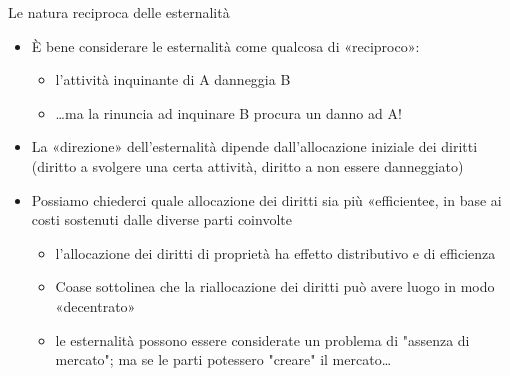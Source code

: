\documentclass[aspectratio=64,11pt]{beamer}
\begin{document}
\begin{frame}{Le natura reciproca delle esternalità}
\begin{itemize}
\item È bene considerare le esternalità come qualcosa di «reciproco»:
\begin{itemize}
\item l'attività inquinante di A danneggia B
\item \ldots{}ma la rinuncia ad inquinare B procura un danno ad A!
\end{itemize}
\item La «direzione» dell'esternalità dipende dall'allocazione iniziale dei
diritti (diritto a svolgere una certa attività, diritto a non essere
danneggiato)
\item Possiamo chiederci quale allocazione dei diritti sia più «efficiente¢, in
base ai costi sostenuti dalle diverse parti coinvolte
\begin{itemize}
\item l'allocazione dei diritti di proprietà ha effetto distributivo e di
efficienza
\item Coase sottolinea che la riallocazione dei diritti può avere luogo in modo
«decentrato»
\item le esternalità possono essere considerate un problema di "assenza di
mercato"; ma se le parti potessero "creare" il mercato\ldots{}
\end{itemize}
\end{itemize}
\end{frame}
\end{document}
